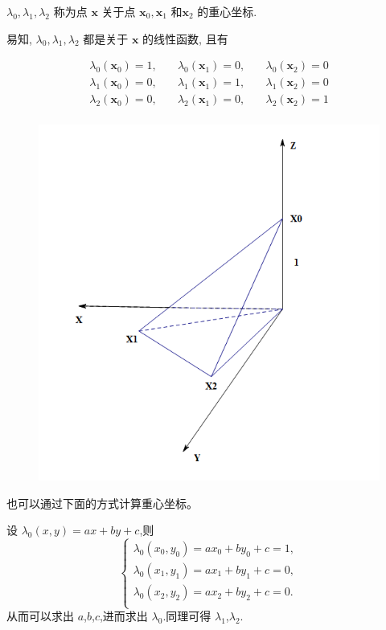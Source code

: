 \documentclass{article}
\begin{document}
$\lambda_0,\lambda_1,\lambda_2$ 称为点 $\mathbf{x}$ 关于点 $\mathbf{x}_0,\mathbf{x}_1$ 和$\mathbf{x}_2$ 的重心坐标. 

易知, $\lambda_0, \lambda_1, \lambda_2$ 都是关于 $\mathbf x$ 的线性函数, 且有

\begin{eqnarray*}
\lambda_0(\mathbf x_0) = 1,\quad & \lambda_0(\mathbf x_1) = 0,\quad& \lambda_0(\mathbf x_2) = 0\\
\lambda_1(\mathbf x_0) = 0,\quad & \lambda_1(\mathbf x_1) = 1,\quad& \lambda_1(\mathbf x_2) = 0\\
\lambda_2(\mathbf x_0) = 0,\quad & \lambda_2(\mathbf x_1) = 0,\quad & \lambda_2(\mathbf x_2) = 1\\
\end{eqnarray*}

\begin{figure}[H]
\centering
\includegraphics[scale=0.7]{./figures/3.png}
\caption{}
\end{figure}

也可以通过下面的方式计算重心坐标。

设 $\lambda_0 (x,y)=ax+by+c$,则
$$
\begin{cases}
\lambda _0 (x_0,y_0)=ax_0+by_0+c=1,\\
\lambda _0 (x_1,y_1)=ax_1+by_1+c=0,\\
\lambda _0 (x_2,y_2)=ax_2+by_2+c=0.\\
\end{cases}
$$
从而可以求出 $a$,$b$,$c$,进而求出 $\lambda _0$.同理可得 $\lambda _1$,$\lambda _2$.
\end{document}
